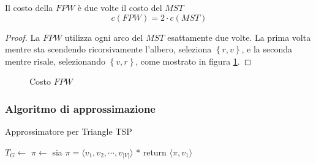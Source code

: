 \begin{proposizione}
    \label{prop:costofpw}
    Il costo della $FPW$ è due volte il costo del $MST$
    \begin{equation*}
        c(FPW) = 2 \cdot c(MST)
    \end{equation*}
    \begin{proof}
        La $FPW$ utilizza ogni arco del $MST$ esattamente due volte. La prima volta mentre sta scendendo ricorsivamente l'albero, seleziona $\left\{ r,v \right\}$, e la seconda mentre risale, selezionando $\left\{ v,r \right\}$, come mostrato in figura \ref{fig:fpwcost}.
    \end{proof}
\end{proposizione}
\begin{figure}[ht]
    \centering
    \caption{Costo $FPW$}
    \label{fig:fpwcost}
\end{figure}

\subsubsection{Algoritmo di approssimazione}
\begin{algorithm}[H]
\caption{Approssimatore per Triangle TSP}\label{alg:approxttsp}
\begin{algorithmic}[1]
        \State $T_G \gets$ 
        \State $\pi \gets$ 
        \State * sia $\pi = \langle v_1, v_2, \cdots, v_{|V|}\rangle $ *
        \State return $\langle \pi, v_1 \rangle $
    \EndProcedure
\end{algorithmic}
\end{algorithm}

